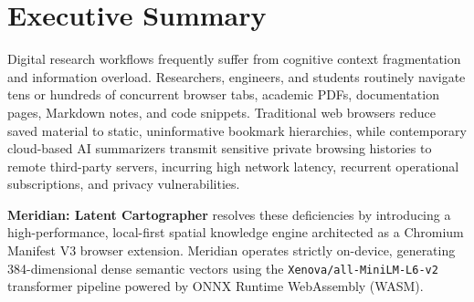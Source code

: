 \documentclass{tietreport}
\author{%
  \texttt{1024160014} Rahul Dadwal \\
  \texttt{1024160133} Jyotsna Sachdeva \\
  \texttt{1024160130} Bisman Singh Rai%
}
\begin{document}
\maketitle
\tableofcontents

\chapter*{Executive Summary}

Digital research workflows frequently suffer from cognitive context fragmentation and information overload. Researchers, engineers, and students routinely navigate tens or hundreds of concurrent browser tabs, academic PDFs, documentation pages, Markdown notes, and code snippets. Traditional web browsers reduce saved material to static, uninformative bookmark hierarchies, while contemporary cloud-based AI summarizers transmit sensitive private browsing histories to remote third-party servers, incurring high network latency, recurrent operational subscriptions, and privacy vulnerabilities.

\textbf{Meridian: Latent Cartographer} resolves these deficiencies by introducing a high-performance, local-first spatial knowledge engine architected as a Chromium Manifest V3 browser extension. Meridian operates strictly on-device, generating 384-dimensional dense semantic vectors using the \texttt{Xenova/all-MiniLM-L6-v2} transformer pipeline powered by ONNX Runtime WebAssembly (WASM).
\end{document}
